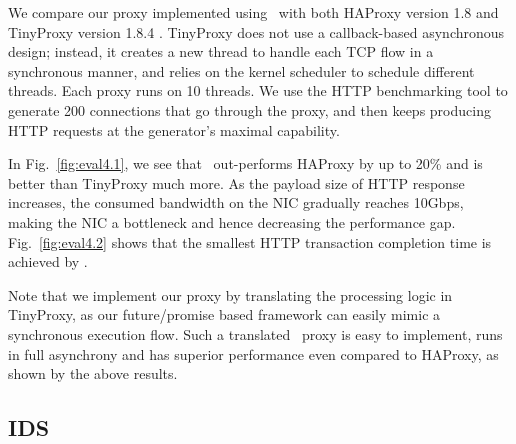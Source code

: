 We compare our proxy implemented using \netstar~with both HAProxy version 1.8 \cite{haproxy} and TinyProxy version 1.8.4 \cite{tinyproxy}.
TinyProxy does not use a callback-based asynchronous design; instead, it creates a new thread to handle each TCP flow in a synchronous manner, and relies on the kernel scheduler to schedule different threads. Each proxy runs on 10 threads. %
We use the HTTP benchmarking tool to generate 200 connections that go through the proxy, and then keeps producing HTTP requests at the generator's maximal capability. %

In Fig.~\ref{fig:eval4.1}, we see that \netstar~out-performs HAProxy by up to 20\% and is better than TinyProxy much more. As the payload size of HTTP response increases, the consumed bandwidth on the NIC gradually reaches 10Gbps, making the NIC a bottleneck and hence decreasing the performance gap. %
Fig.~\ref{fig:eval4.2} shows that the smallest HTTP transaction completion time is achieved by \netstar.

Note that we implement our proxy by translating the processing logic in TinyProxy, as our future/promise based framework can easily mimic a synchronous execution flow. Such a translated \netstar~proxy is easy to implement, runs in full asynchrony and has superior performance even compared to HAProxy, as shown by the above results.


\subsection {IDS}
\label{sec:eval4}

